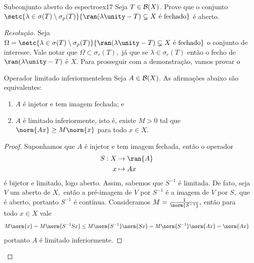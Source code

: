 \begin{exercício}{Subconjunto aberto do espectro}{ex17}
  Seja \(T \in \mathcal{B}(X)\). Prove que o conjunto \(\setc{\lambda \in \sigma(T) \setminus \sigma_p(T)}{\ran(\lambda \unity - T) \subsetneq X\text{ é fechado}}\) é aberto.
\end{exercício}
\begin{proof}[Resolução]
  Seja \(\Omega = \setc{\lambda \in \sigma(T) \setminus \sigma_p(T)}{\ran(\lambda \unity - T) \subsetneq X\text{ é fechado}}\) o conjunto de interesse. Vale notar que \(\Omega \subset \sigma_r(T),\) já que se \(\lambda \in \sigma_c(T)\) então o fecho de \(\ran(\lambda \unity - T)\) é \(X.\) Para prosseguir com a demonstração, vamos provar o
  \begin{lemma}{Operador limitado inferiormente}{lem}
      Seja \(A \in \mathcal{B}(X)\). As afirmações abaixo são equivalentes:
      \begin{enumerate}[label=(\alph*)]
          \item \(A\) é injetor e tem imagem fechada; e
          \item \(A\) é limitado inferiormente, isto é, existe \(M > 0\) tal que \(\norm{Ax} \geq M\norm{x}\) para todo \(x \in X.\)
      \end{enumerate}
  \end{lemma}
  \begin{proof}
    Suponhamos que \(A\) é injetor e tem imagem fechada, então o operador
    \begin{align*}
      S : X &\to \ran{A}\\
          x &\mapsto Ax
    \end{align*}
    é bijetor e limitado, logo aberto. Assim, sabemos que \(S^{-1}\) é limitada. De fato, seja \(V\) um aberto de \(X,\) então a pré-imagem de \(V\) por \(S^{-1}\) é a imagem de \(V\) por \(S,\) que é aberto, portanto \(S^{-1}\) é contínua. Consideramos \(M = \frac{1}{\norm{S^{-1}}},\) então para todo \(x \in X\) vale
    \begin{equation*}
      M\norm{x} = M\norm{S^{-1} S x} \leq M\norm{S^{-1}}\norm{Sx} = M\norm{S^{-1}} \norm{Ax} = \norm{Ax}
    \end{equation*}
    portanto \(A\) é limitado inferiormente.


\end{proof}
\end{proof}
